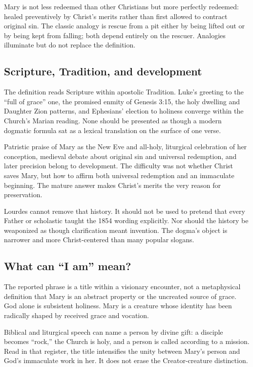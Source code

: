 Mary is not less redeemed than other Christians but more perfectly redeemed: healed preventively by Christ's merits rather than first allowed to contract original sin. The classic analogy is rescue from a pit either by being lifted out or by being kept from falling; both depend entirely on the rescuer. Analogies illuminate but do not replace the definition.

\subsection{Scripture, Tradition, and development}

The definition reads Scripture within apostolic Tradition. Luke's greeting to the “full of grace” one, the promised enmity of Genesis 3:15, the holy dwelling and Daughter Zion patterns, and Ephesians' election to holiness converge within the Church's Marian reading. None should be presented as though a modern dogmatic formula sat as a lexical translation on the surface of one verse.

Patristic praise of Mary as the New Eve and all-holy, liturgical celebration of her conception, medieval debate about original sin and universal redemption, and later precision belong to development. The difficulty was not whether Christ saves Mary, but how to affirm both universal redemption and an immaculate beginning. The mature answer makes Christ's merits the very reason for preservation.

Lourdes cannot remove that history. It should not be used to pretend that every Father or scholastic taught the 1854 wording explicitly. Nor should the history be weaponized as though clarification meant invention. The dogma's object is narrower and more Christ-centered than many popular slogans.

\subsection{What can “I am” mean?}

The reported phrase is a title within a visionary encounter, not a metaphysical definition that Mary is an abstract property or the uncreated source of grace. God alone is subsistent holiness. Mary is a creature whose identity has been radically shaped by received grace and vocation.

Biblical and liturgical speech can name a person by divine gift: a disciple becomes “rock,” the Church is holy, and a person is called according to a mission. Read in that register, the title intensifies the unity between Mary's person and God's immaculate work in her. It does not erase the Creator-creature distinction.

